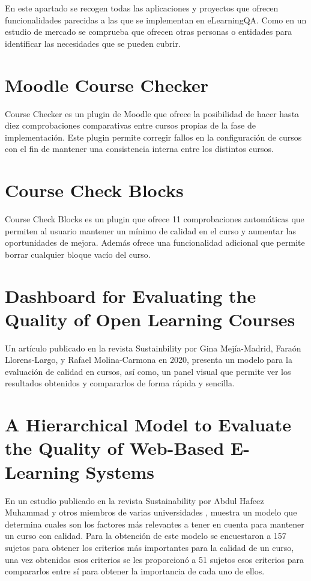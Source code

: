 
En este apartado se recogen todas las aplicaciones y proyectos que ofrecen funcionalidades parecidas a las que se implementan en eLearningQA. Como en un estudio de mercado se comprueba que ofrecen otras personas o entidades para identificar las necesidades que se pueden cubrir. 

\section{Moodle Course Checker}
Course Checker \cite{moodle-course-checker} es un plugin de Moodle que ofrece la posibilidad de hacer hasta diez comprobaciones comparativas entre cursos propias de la fase de implementación. Este plugin permite corregir fallos en la configuración de cursos con el fin de mantener una consistencia interna entre los distintos cursos.

\section{Course Check Blocks}
Course Check Blocks \cite{course-checks-blocks} es un plugin que ofrece 11 comprobaciones automáticas que permiten al usuario mantener un mínimo de calidad en el curso y aumentar las oportunidades de mejora. Además ofrece una funcionalidad adicional que permite borrar cualquier bloque vacío del curso.

\section{Dashboard for Evaluating the Quality of Open Learning Courses}
Un artículo \cite{modelo-sustanabilty} publicado en la revista Sustainbility por Gina Mejía-Madrid, Faraón Llorens-Largo, y Rafael Molina-Carmona en 2020, presenta un modelo para la evaluación de calidad en cursos, así como, un panel visual que permite ver los resultados obtenidos y compararlos de forma rápida y sencilla.

\section{A Hierarchical Model to Evaluate the Quality of Web-Based E-Learning Systems}
En un estudio publicado en la revista Sustainability por Abdul Hafeez Muhammad y otros miembros de varias universidades \cite{marco-calidad-muhammad}, muestra un modelo que determina cuales son los factores más relevantes a tener en cuenta para mantener un curso con calidad. Para la obtención de este modelo se encuestaron a 157 sujetos para obtener los criterios más importantes para la calidad de un curso, una vez obtenidos esos criterios se les proporcionó a 51 sujetos esos criterios para compararlos entre sí para obtener la importancia de cada uno de ellos.

